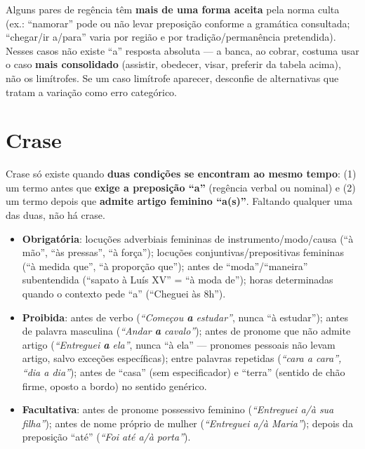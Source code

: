 \begin{cuidado}
Alguns pares de regência têm \textbf{mais de uma forma aceita} pela norma
culta (ex.: “namorar” pode ou não levar preposição conforme a gramática
consultada; “chegar/ir a/para” varia por região e por tradição/permanência
pretendida). Nesses casos não existe “a” resposta absoluta --- a banca, ao
cobrar, costuma usar o caso \textbf{mais consolidado} (assistir, obedecer,
visar, preferir da tabela acima), não os limítrofes. Se um caso limítrofe
aparecer, desconfie de alternativas que tratam a variação como erro
categórico.
\end{cuidado}

\section{Crase}

\begin{conceito}
Crase só existe quando \textbf{duas condições se encontram ao mesmo tempo}:
(1) um termo antes que \textbf{exige a preposição “a”} (regência verbal ou
nominal) e (2) um termo depois que \textbf{admite artigo feminino “a(s)”}.
Faltando qualquer uma das duas, não há crase.

\begin{itemize}
\item \textbf{Obrigatória}: locuções adverbiais femininas de instrumento/modo/causa
(“à mão”, “às pressas”, “à força”); locuções conjuntivas/prepositivas
femininas (“à medida que”, “à proporção que”); antes de “moda”/“maneira”
subentendida (“sapato à Luís XV” = “à moda de”); horas determinadas quando
o contexto pede “a” (“Cheguei às 8h”).
\item \textbf{Proibida}: antes de verbo (\textit{“Começou \textbf{a}
estudar”}, nunca “à estudar”); antes de palavra masculina (\textit{“Andar
\textbf{a} cavalo”}); antes de pronome que não admite artigo (\textit{“Entreguei
\textbf{a} ela”}, nunca “à ela” --- pronomes pessoais não levam artigo,
salvo exceções específicas); entre palavras repetidas (\textit{“cara a
cara”, “dia a dia”}); antes de “casa” (sem especificador) e “terra” (sentido
de chão firme, oposto a bordo) no sentido genérico.
\item \textbf{Facultativa}: antes de pronome possessivo feminino
(\textit{“Entreguei a/à sua filha”}); antes de nome próprio de mulher
(\textit{“Entreguei a/à Maria”}); depois da preposição “até”
(\textit{“Foi até a/à porta”}).
\end{itemize}
\end{conceito}

